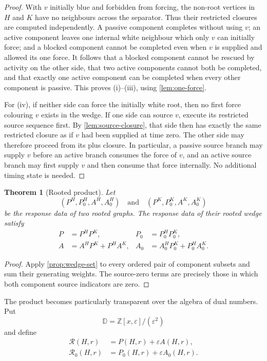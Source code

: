 \documentclass[11pt,reqno]{amsart}
\newtheorem{theorem}{Theorem}[section]
\theoremstyle{definition}
\newcommand{\Dalg}{\mathbb D}
\newcommand{\eps}{\varepsilon}
\begin{document}
\begin{proof}
With $v$ initially blue and forbidden from forcing, the non-root vertices in
$H$ and $K$ have no neighbours across the separator.  Thus their restricted
closures are computed independently.  A passive component completes without
using $v$; an active component leaves one internal white neighbour which only
$v$ can initially force; and a blocked component cannot be completed even
when $v$ is supplied and allowed its one force.  It follows that a blocked
component cannot be rescued by activity on the other side, that two active
components cannot both be completed, and that exactly one active component
can be completed when every other component is passive.  This proves
(i)--(iii), using \cref{lem:one-force}.

For (iv), if neither side can force the initially white root, then no first
force colouring $v$ exists in the wedge.  If one side can source $v$, execute
its restricted source sequence first.  By \cref{lem:source-closure}, that side
then has exactly the same restricted closure as if $v$ had been supplied at
time zero.  The other side may therefore proceed from its plus closure.  In
particular, a passive source branch may supply $v$ before an active branch
consumes the force of $v$, and an active source branch may first supply $v$
and then consume that force internally.  No additional timing state is
needed.
\end{proof}

\begin{theorem}[Rooted product]\label{thm:wedge}
Let
\[
  (P^H,P_0^H,A^H,A_0^H)
  \quad\text{and}\quad
  (P^K,P_0^K,A^K,A_0^K)
\]
be the response data of two rooted graphs.  The response data of their rooted
wedge satisfy
\begin{align}
  P&=P^HP^K, & P_0&=P_0^HP_0^K,\label{eq:wedge-passive}\\
  A&=A^HP^K+P^HA^K,
  & A_0&=A_0^HP_0^K+P_0^HA_0^K.\label{eq:wedge-active}
\end{align}
\end{theorem}

\begin{proof}
Apply \cref{prop:wedge-set} to every ordered pair of component subsets and
sum their generating weights.  The source-zero terms are precisely those in
which both component source indicators are zero.
\end{proof}

The product becomes particularly transparent over the algebra of dual numbers.  Put
\[
  \Dalg=\mathbb Z[x,\eps]/(\eps^2)
\]
and define
\begin{align*}
  \mathscr R(H,r)&=P(H,r)+\eps A(H,r),\\
  \mathscr R_0(H,r)&=P_0(H,r)+\eps A_0(H,r).
\end{align*}
\end{document}
